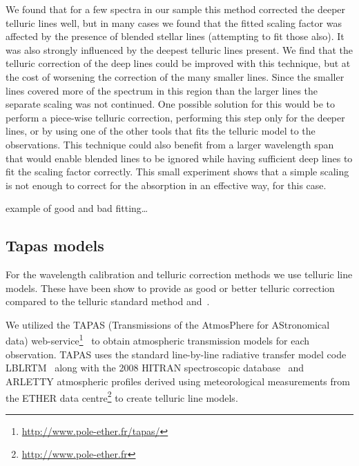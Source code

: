We found that for a few spectra in our sample this method corrected the deeper telluric lines well, but in many cases we found that the fitted scaling factor was affected by the presence of blended stellar lines (attempting to fit those also).
It was also strongly influenced by the deepest   telluric lines present.
We find that the telluric correction of the deep  lines could be improved with this technique, but at the cost of worsening the correction of the many smaller  lines.
Since the smaller  lines covered more of the spectrum in this region than the larger lines the separate  scaling was not continued.
One possible solution for this would be to perform a piece-wise telluric correction, performing this step only for the deeper  lines, or by using one of the other tools that fits the telluric model to the observations.
This technique could also benefit from a larger wavelength span that would enable blended lines to be ignored while having sufficient deep  lines to fit the scaling factor correctly.
This small experiment shows that a simple scaling is not enough to correct for the absorption in an effective way, for this case.



 example of good and bad fitting\ldots


\subsection{Tapas models}
\label{subsec:tapas_models_usage}
For the wavelength calibration and telluric correction methods we use telluric line models.
These have been show to provide as good or better telluric correction compared to the telluric standard method and~\citep{ulmer-moll_telluric_2018}.

We utilized the {TAPAS} (Transmissions of the {AtmosPhere} for {AStronomical} data) web-service\footnote{\href{http://www.pole-ether.fr/tapas/}{http://www.pole-ether.fr/tapas/}}~\citep{bertaux_tapas_2014} to obtain atmospheric transmission models for each observation. {TAPAS} uses the standard line-by-line radiative transfer model code {LBLRTM}~\citep{clough_linebyline_1995} along with the 2008 {HITRAN} spectroscopic database~\citep{rothman_hitran_2009} and {ARLETTY} atmospheric profiles derived using meteorological measurements from the {ETHER} data centre\footnote{\href{http://www.pole-ether.fr}{http://www.pole-ether.fr}} to create telluric line models.

